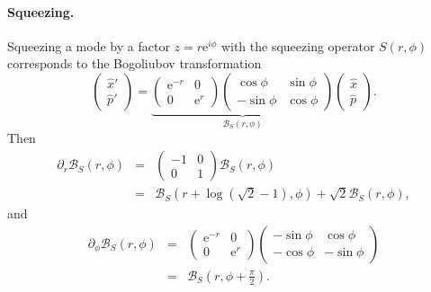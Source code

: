 \documentclass[aps,pra,10pt,twocolumn,groupedaddress,nofootinbib]{revtex4-1}
\theoremstyle{plain}
\newcommand{\x}{\hat{x}}
\newcommand{\p}{\hat{p}}
\newcommand{\e}{\mathrm{e}}
\begin{document}
\paragraph{Squeezing.}
Squeezing a mode by a factor $z = r \e^{i\phi}$ with the squeezing operator $S(r, \phi)$ corresponds to the Bogoliubov transformation
\[ \begin{pmatrix} \x'\\ \p' \end{pmatrix} = \underbrace{\begin{pmatrix} \e^{-r} & 0 \\ 0 & \e^{r} \end{pmatrix} \begin{pmatrix} \cos \phi & \sin \phi \\ - \sin \phi & \cos \phi \end{pmatrix}}_{\mathcal{B}_S(r, \phi)} \begin{pmatrix} \x \\ \p \end{pmatrix}. \]
Then
\begin{eqnarray*} \partial_{r} \mathcal{B}_S(r, \phi) &=& \begin{pmatrix} -1 & 0 \\ 0 & 1 \end{pmatrix}
\mathcal{B}_S(r, \phi) \\
&=& \mathcal{B}_S(r+\log (\sqrt{2}-1), \phi) + \sqrt{2} \mathcal{B}_S(r, \phi),\end{eqnarray*}
and
\begin{eqnarray*} \partial_{\phi} \mathcal{B}_S(r, \phi) &=& \begin{pmatrix} \e^{-r} & 0 \\ 0 & \e^{r} \end{pmatrix} \begin{pmatrix} -\sin \phi & \cos \phi \\ - \cos \phi & -\sin \phi \end{pmatrix}\\
&=& \mathcal{B}_S(r, \phi + \frac{\pi}{2}).\end{eqnarray*}
\end{document}
